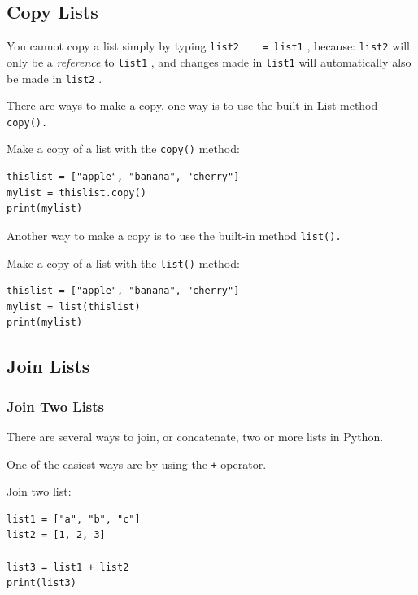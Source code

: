 \documentclass[12pt,a4paper]{article}
\newcommand{\code}[1]{%
	\colorbox{backcolour}{\lstinline{#1}}%
}
\newcommand{\lcode}[1]{%
	\lstinline{#1}%
}
\begin{document}
\subsection{Copy Lists}

You cannot copy a list simply by typing \code{list2    = list1}, because:
\code{list2} will only be a \textit{reference} to \code{list1}, and changes
made in \code{list1} will automatically also be made in \code{list2}.

There are ways to make a copy, one way is to use the built-in List method \code{copy().}

\begin{ebox}
Make a copy of a list with the \lcode{copy()} method:
	\begin{lstlisting}
thislist = ["apple", "banana", "cherry"]
mylist = thislist.copy()
print(mylist)
	\end{lstlisting}
\tcblower
	\begin{vercode}
	\end{vercode}
\end{ebox}

Another way to make a copy is to use the built-in method \code{list().}

\begin{ebox}
Make a copy of a list with the \lcode{list()} method:
	\begin{lstlisting}
thislist = ["apple", "banana", "cherry"]
mylist = list(thislist)
print(mylist)
	\end{lstlisting}
\tcblower
	\begin{vercode}
	\end{vercode}
\end{ebox}
\subsection{Join Lists}
\subsubsection{Join Two Lists}

There are several ways to join, or concatenate, two or more lists in Python.

One of the easiest ways are by using the \code{+} operator.

\begin{ebox}
Join two list:
	\begin{lstlisting}
list1 = ["a", "b", "c"]
list2 = [1, 2, 3]

list3 = list1 + list2
print(list3)
	\end{lstlisting}
\tcblower
	\begin{vercode}
['a', 'b', 'c', 1, 2, 3]
	\end{vercode}
\end{ebox}
\end{document}
